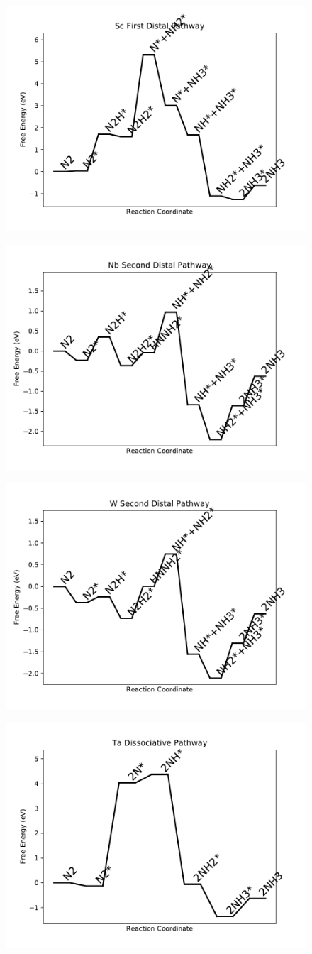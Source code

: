 \documentclass[journal=jacsat,manuscript=article]{achemso}
\begin{document}
\begin{figure}
\includegraphics[width=0.5\linewidth]{data/plots/Sc_distal_1.pdf}
\label{fig:Sc_distal_1}
\end{figure}

\newpage
\begin{figure}
\includegraphics[width=0.5\linewidth]{data/plots/Nb_distal_2.pdf}
\label{fig:Nb_distal_2}
\end{figure}

\begin{figure}
\includegraphics[width=0.5\linewidth]{data/plots/W_distal_2.pdf}
\label{fig:W_distal_2}
\end{figure}

\newpage
\begin{figure}
\includegraphics[width=0.5\linewidth]{data/plots/Ta_dissociative.pdf}
\label{fig:Ta_dissociative}
\end{figure}
\end{document}
